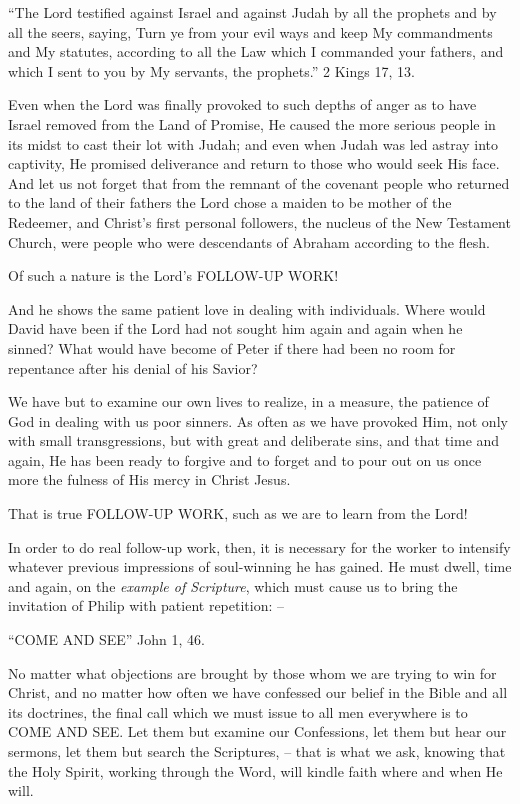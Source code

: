 \documentclass[
]{book}
\begin{document}
``The Lord testified against Israel and against Judah by all the prophets and by all the seers, saying, Turn ye from your evil ways and keep My commandments and My statutes, according to all the Law which I commanded your fathers, and which I sent to you by My servants, the prophets.'' 2 Kings 17, 13.

Even when the Lord was finally provoked to such depths of anger as to have Israel removed from the Land of Promise, He caused the more serious people in its midst to cast their lot with Judah; and even when Judah was led astray into captivity, He promised deliverance and return to those who would seek His face. And let us not forget that from the remnant of the covenant people who returned to the land of their fathers the Lord chose a maiden to be mother of the Redeemer, and Christ's first personal followers, the nucleus of the New Testament Church, were people who were descendants of Abraham according to the flesh.

Of such a nature is the Lord's FOLLOW-UP WORK!

And he shows the same patient love in dealing with individuals. Where would David have been if the Lord had not sought him again and again when he sinned? What would have become of Peter if there had been no room for repentance after his denial of his Savior?

We have but to examine our own lives to realize, in a measure, the patience of God in dealing with us poor sinners. As often as we have provoked Him, not only with small transgressions, but with great and deliberate sins, and that time and again, He has been ready to forgive and to forget and to pour out on us once more the fulness of His mercy in Christ Jesus.

That is true FOLLOW-UP WORK, such as we are to learn from the Lord!

In order to do real follow-up work, then, it is necessary for the worker to intensify whatever previous impressions of soul-winning he has gained. He must dwell, time and again, on the \emph{example of Scripture}, which must cause us to bring the invitation of Philip with patient repetition: --

``COME AND SEE'' John 1, 46.

No matter what objections are brought by those whom we are trying to win for Christ, and no matter how often we have confessed our belief in the Bible and all its doctrines, the final call which we must issue to all men everywhere is to COME AND SEE. Let them but examine our Confessions, let them but hear our sermons, let them but search the Scriptures, -- that is what we ask, knowing that the Holy Spirit, working through the Word, will kindle faith where and when He will.
\end{document}
